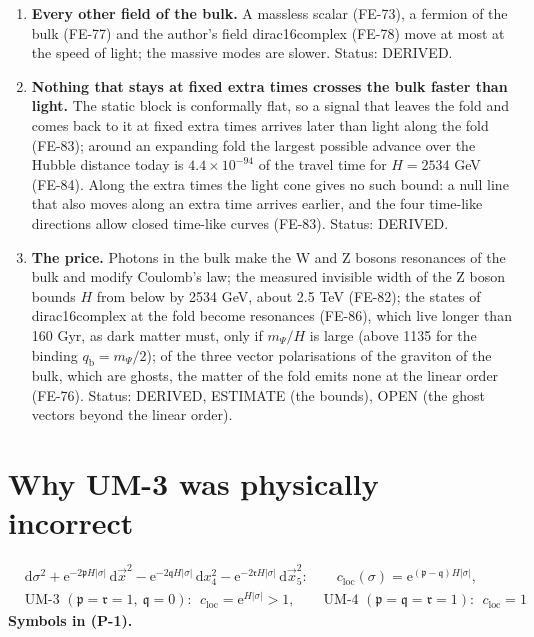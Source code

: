 \documentclass[
  10pt,
]{article}
\begin{document}
\begin{enumerate}
  speed of light (FE-74); the photon is a transverse wave of helicity
  \(\pm1\) whose electric and magnetic fields are orthogonal to its
  direction of motion and to each other (FE-75). Status: ASSUMED (the
  gauge fields in the bulk), DERIVED (the rest).
\item
  \textbf{Every other field of the bulk.} A massless scalar (FE-73), a
  fermion of the bulk (FE-77) and the author's field dirac16complex
  (FE-78) move at most at the speed of light; the massive modes are
  slower. Status: DERIVED.
\item
  \textbf{Nothing that stays at fixed extra times crosses the bulk
  faster than light.} The static block is conformally flat, so a signal
  that leaves the fold and comes back to it at fixed extra times arrives
  later than light along the fold (FE-83); around an expanding fold the
  largest possible advance over the Hubble distance today is
  \(4.4\times10^{-94}\) of the travel time for \(H = 2534\) GeV (FE-84).
  Along the extra times the light cone gives no such bound: a null line
  that also moves along an extra time arrives earlier, and the four
  time-like directions allow closed time-like curves (FE-83). Status:
  DERIVED.
\item
  \textbf{The price.} Photons in the bulk make the W and Z bosons
  resonances of the bulk and modify Coulomb's law; the measured
  invisible width of the Z boson bounds \(H\) from below by 2534 GeV,
  about 2.5 TeV (FE-82); the states of dirac16complex at the fold become
  resonances (FE-86), which live longer than 160 Gyr, as dark matter
  must, only if \(m_\Psi/H\) is large (above 1135 for the binding
  \(q_{\mathrm{b}} = m_\Psi/2\)); of the three vector polarisations of
  the graviton of the bulk, which are ghosts, the matter of the fold
  emits none at the linear order (FE-76). Status: DERIVED, ESTIMATE (the
  bounds), OPEN (the ghost vectors beyond the linear order).
\end{enumerate}

\hypertarget{why-um-3-was-physically-incorrect}{%
\section{Why UM-3 was physically
incorrect}\label{why-um-3-was-physically-incorrect}}

\[
\begin{aligned}
&\mathrm{d}\sigma^2 + \mathrm{e}^{-2\mathfrak{p}H\lvert\sigma\rvert}\,\mathrm{d}\vec x^2 - \mathrm{e}^{-2\mathfrak{q}H\lvert\sigma\rvert}\,\mathrm{d}x_4^2
 - \mathrm{e}^{-2\mathfrak{r}H\lvert\sigma\rvert}\,\mathrm{d}\vec x_5^2:\qquad
 c_{\mathrm{loc}}(\sigma) = \mathrm{e}^{(\mathfrak{p} - \mathfrak{q})H\lvert\sigma\rvert},\\
&\text{UM-3 } (\mathfrak{p} = \mathfrak{r} = 1,\ \mathfrak{q} = 0):\ \ c_{\mathrm{loc}} = \mathrm{e}^{H\lvert\sigma\rvert} > 1,\qquad
 \text{UM-4 } (\mathfrak{p} = \mathfrak{q} = \mathfrak{r} = 1):\ \ c_{\mathrm{loc}} = 1
\end{aligned} \tag{P-1}
\] \textbf{Symbols in (P-1).}
\end{document}
